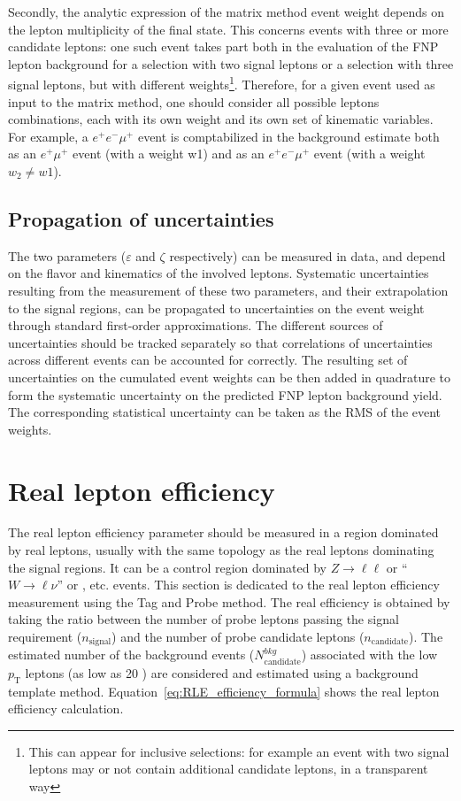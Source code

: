 Secondly, the analytic expression of the matrix method event weight depends on the lepton multiplicity of the final state. This concerns events with three or more candidate leptons: one such event takes part both in the evaluation of the FNP lepton background for a selection with two signal leptons or a selection with three signal leptons, but with different weights\footnote{This can appear for inclusive selections: for example an event with two signal leptons may or not contain additional candidate leptons, in a transparent way}. Therefore, for a given event used as input to the matrix method, one should consider all possible leptons combinations, each with its own weight and its own set of kinematic variables. For example, a $e^+e^-\mu^+$ event is comptabilized in the background estimate both as an $e^+\mu^+$ event (with a weight w1) and as an $e^+e^-\mu^+$ event (with a weight $w_2\neq w1$).  

\subsection{Propagation of uncertainties}

The two parameters ($\varepsilon$ and $\zeta$ respectively) can be measured in data, and depend on the flavor and kinematics of the involved leptons.  Systematic uncertainties resulting from the measurement of these two parameters, and their extrapolation to the signal regions, can be propagated to uncertainties on the event weight through standard first-order approximations. The different sources of uncertainties should be tracked separately so that correlations of uncertainties across different events can be accounted for correctly. The resulting set of uncertainties on the cumulated event weights can be then added in quadrature to form the systematic uncertainty on the predicted FNP lepton background yield. The corresponding statistical uncertainty can be taken as the RMS of the event weights.


\section{Real lepton efficiency}
\graphicspath{{figures/real_lepton_efficiency/}}
The real lepton efficiency parameter should be measured in a region dominated by real leptons, usually with the same topology as the real leptons dominating the signal regions. It can be a control region dominated by $Z\to\ell\ell$ or ``$W\to\ell\nu$'' or \ttbar, etc. events.
This section is dedicated to the real lepton efficiency measurement using the Tag and Probe method. 
The real efficiency is obtained by taking the ratio between the number of probe leptons passing the signal requirement 
($n_\mathrm{signal}$) and the number of probe candidate leptons ($n_\mathrm{candidate}$).
The estimated number of the background events ($N_\mathrm{candidate}^{bkg}$) associated with the low $p_\mathrm{T}$ leptons 
(as low as 20 \GeV) are considered and estimated using a background template method.
Equation~\ref{eq:RLE_efficiency_formula} shows the real lepton efficiency calculation.

